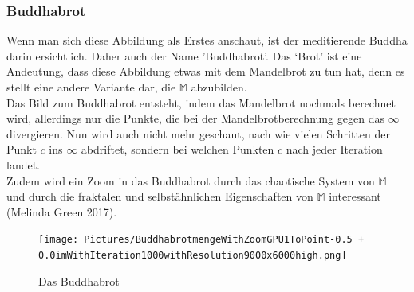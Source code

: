 \subsubsection{Buddhabrot}
Wenn man sich diese Abbildung als Erstes anschaut, ist der meditierende Buddha darin ersichtlich. Daher auch der Name ’Buddhabrot’. Das ‘Brot’ ist eine Andeutung, dass diese Abbildung etwas mit dem Mandelbrot zu tun hat, denn es stellt eine andere Variante dar, die $\mathbb{M}$ abzubilden.\\ 
Das Bild zum Buddhabrot entsteht, indem das Mandelbrot nochmals berechnet wird, allerdings nur die Punkte, die bei der Mandelbrotberechnung gegen das $\infty$ divergieren. Nun wird auch nicht mehr geschaut, nach wie vielen Schritten der Punkt $c$ ins $\infty$ abdriftet, sondern bei welchen Punkten $c$ nach jeder Iteration landet.\\
Zudem wird ein Zoom in das Buddhabrot durch das chaotische System von $\mathbb{M}$ und durch die fraktalen und selbstähnlichen Eigenschaften von $\mathbb{M}$ interessant (Melinda Green 2017).
\begin{figure}[h]
	\centering
	\texttt{[image: Pictures/BuddhabrotmengeWithZoomGPU1ToPoint-0.5 + 0.0imWithIteration1000withResolution9000x6000high.png]}
	\caption[Das Buddhabrot (eigenes Bild)]{Das Buddhabrot}
	\label{fig:Buddhabrot}
\end{figure}